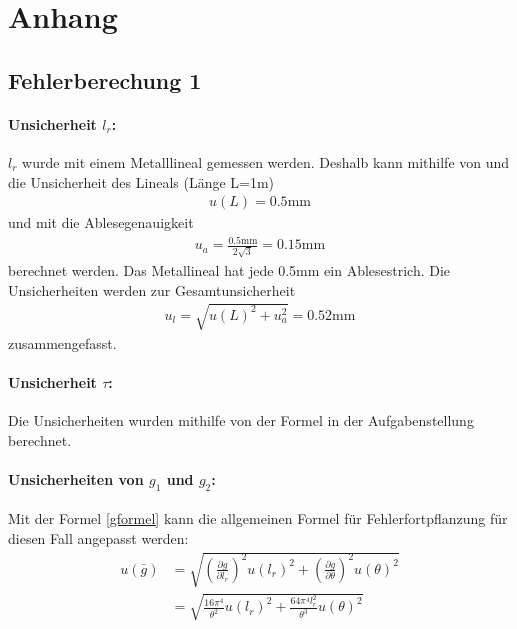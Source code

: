 \documentclass[11pt, a4paper]{article}
\begin{document}
    \section{Anhang}
    \subsection{Fehlerberechung 1}
    
    \paragraph{Unsicherheit $l_r$:}
    $l_r$ wurde mit einem Metalllineal gemessen werden. Deshalb kann mithilfe von \cite[Gleichung (40)]{ABW}
    und \cite[Tabelle 5]{ABW} die Unsicherheit des Lineals (Länge L=1m)
    \begin{align}
        u(L) = 0.5\si{\milli\metre}
    \end{align}
    und mit \cite[Tabelle 1]{ABW} die Ablesegenauigkeit
    \begin{align}
        u_a = \frac{0.5\si{\milli\metre}}{2\sqrt{3}} = 0.15\si{\milli\metre}
    \end{align}
    berechnet werden. Das Metallineal hat jede 0.5mm ein Ablesestrich.
    Die Unsicherheiten werden zur Gesamtunsicherheit
    \begin{align}
        u_l = \sqrt{u(L)^2 + u_a^2 } = 0.52\si{\milli\metre}
    \end{align} 
    zusammengefasst.
    \paragraph{Unsicherheit $\tau$:}
    Die Unsicherheiten wurden mithilfe von der Formel in der Aufgabenstellung \cite[Aufgabe 8]{pen} berechnet.

    \paragraph{Unsicherheiten von $g_1$ und $g_2$:}
    Mit der Formel \ref{gformel} kann die allgemeinen Formel für Fehlerfortpflanzung
     \cite[Formel (20)]{ABW} für diesen Fall angepasst werden:
     \begin{align}
         u(\bar{g}) &= \sqrt{\left(\frac{\partial g}{\partial l_r}\right)^2 u(l_r)^2 +
         \left(\frac{\partial g}{\partial \theta}\right)^2 u(\theta)^2} \nonumber \\
         &= \sqrt{\frac{16\pi^4}{\theta^2} u(l_r)^2 + \frac{64\pi^4l_r^2}{\theta^3} u(\theta)^2}
     \end{align}
\end{document}
